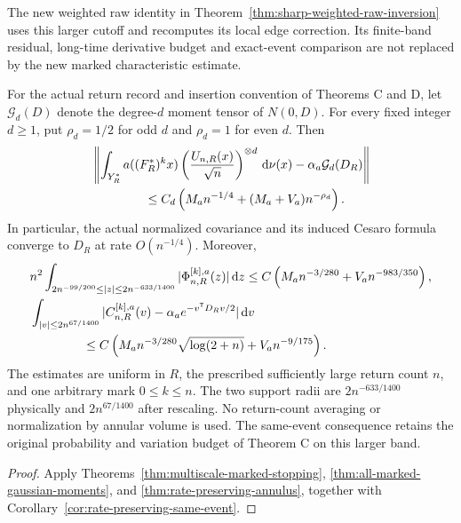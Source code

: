 The new weighted raw identity in
Theorem~\ref{thm:sharp-weighted-raw-inversion} uses this larger cutoff
and recomputes its local edge correction. Its finite-band residual,
long-time derivative budget and exact-event comparison are not replaced
by the new marked characteristic estimate.


\begin{maintheorem}
\label{thm:intro-multiscale-stopping}
For the actual return record and insertion convention of Theorems C and D,
let $\mathcal G_d(D)$ denote the degree-$d$ moment tensor of $N(0,D)$.
For every fixed integer $d\ge1$, put $\rho_d=1/2$ for odd $d$ and
$\rho_d=1$ for even $d$. Then
\begin{align*}
 &\left\|\int_{Y_R^*}a((F_R^*)^kx)
       \left(\frac{U_{n,R}(x)}{\sqrt n}\right)^{\otimes d}\dd\nu(x)
                      -\alpha_a\mathcal G_d(D_R)\right\|\\
 &\hspace{15mm}\le C_d\left(M_an^{-1/4}+(M_a+V_a)n^{-\rho_d}\right).
\end{align*}
In particular, the actual normalized covariance and its induced Cesaro
formula converge to $D_R$ at rate $O(n^{-1/4})$. Moreover,
\begin{align*}
 &n^2\int_{2n^{-99/200}\le|z|\le2n^{-633/1400}}
                    |\Phi^{[k],a}_{n,R}(z)|\dd z
      \le C\left(M_an^{-3/280}+V_an^{-983/350}\right),\\
 &\int_{|v|\le2n^{67/1400}}
       |C^{[k],a}_{n,R}(v)-\alpha_a e^{-v^{\mathsf T}D_Rv/2}|\dd v\\
 &\hspace{15mm}\le C\left(M_an^{-3/280}\sqrt{\log(2+n)}
                                   +V_an^{-9/175}\right).
\end{align*}
The estimates are uniform in $R$, the prescribed sufficiently large
return count $n$, and one arbitrary mark $0\le k\le n$. The two support
radii are $2n^{-633/1400}$ physically and $2n^{67/1400}$ after rescaling.
No return-count averaging or normalization by annular volume is used.
The same-event consequence retains the original probability and variation
budget of Theorem C on this larger band.
\end{maintheorem}
\begin{proof}
Apply Theorems~\ref{thm:multiscale-marked-stopping},
\ref{thm:all-marked-gaussian-moments}, and
\ref{thm:rate-preserving-annulus}, together with
Corollary~\ref{cor:rate-preserving-same-event}.
\end{proof}

